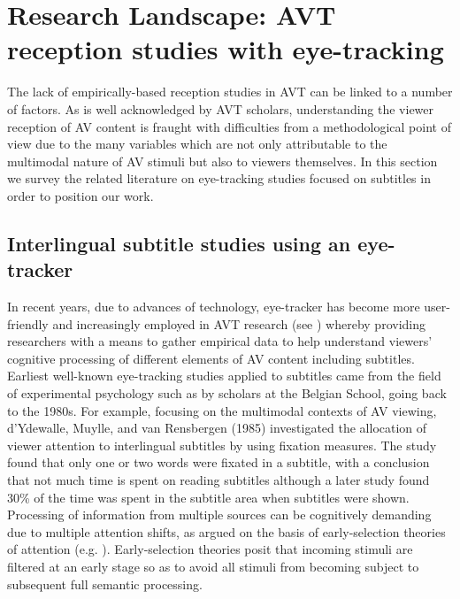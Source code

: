 \documentclass[output=paper]{langsci/langscibook}
\begin{document}
\section{Research Landscape: AVT reception studies with eye-tracking}

The lack of empirically-based reception studies in AVT can be linked to a number of factors. As is well acknowledged by AVT scholars, understanding the viewer reception of AV content is fraught with difficulties from a methodological point of view due to the many variables which are not only attributable to the multimodal nature of AV stimuli but also to viewers themselves.  In this section we survey the related literature on eye-tracking studies focused on subtitles in order to position our work.    

\subsection{Interlingual subtitle studies using an eye-tracker}

In recent years, due to advances of technology, eye-tracker has become more user-friendly and increasingly employed in AVT research (see \citealt{perego2012}) whereby providing researchers with a means to gather empirical data to help understand viewers' cognitive processing of different elements of AV content including subtitles. Earliest well-known eye-tracking studies applied to subtitles came from the field of experimental psychology such as by scholars at the Belgian School, going back to the 1980s. For example, focusing on the multimodal contexts of AV viewing, d'Ydewalle, Muylle, and van Rensbergen (1985) investigated the allocation of viewer attention to interlingual subtitles by using fixation measures. The study found that only one or two words were fixated in a subtitle, with a conclusion that not much time is spent on reading subtitles although a later study \citep{dydewalle1987} found 30\% of the time was spent in the subtitle area when subtitles were shown. Processing of information from multiple sources can be cognitively demanding due to multiple attention shifts, as argued on the basis of early-selection theories of attention (e.g. \citealt{Treisman1968}). Early-selection theories posit that incoming stimuli are filtered at an early stage so as to avoid all stimuli from becoming subject to subsequent full semantic processing.  
\end{document}
